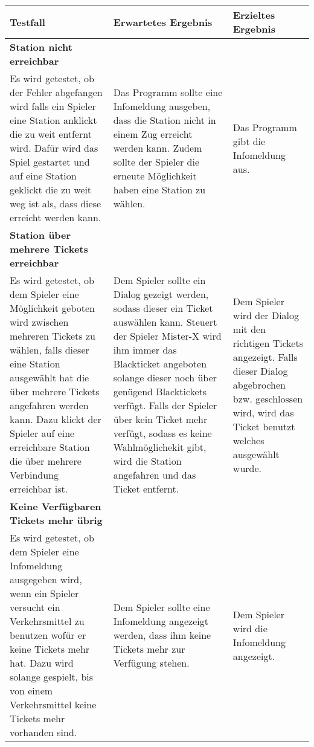     \begin{table}[H]
        \caption{Interaktions Tests}
        \begin{longtable}{p{6cm} p{4cm} p{2cm}} 
            \hline
            \textbf{Testfall} & \textbf{Erwartetes Ergebnis} & \textbf{Erzieltes Ergebnis}\\
            \hline
            \textbf{Station nicht erreichbar}\\
            Es wird getestet, ob der Fehler abgefangen wird falls ein Spieler eine Station anklickt die zu weit entfernt wird.
            Dafür wird das Spiel gestartet und auf eine Station geklickt die zu weit weg ist als, dass diese erreicht werden kann.
            &
            Das Programm sollte eine Infomeldung ausgeben, dass die Station nicht in einem Zug erreicht werden kann.
            Zudem sollte der Spieler die erneute Möglichkeit haben eine Station zu wählen.
            &
            Das Programm gibt die Infomeldung aus.
            \\
            \hline
            \textbf{Station über mehrere Tickets erreichbar}\\
            Es wird getestet, ob dem Spieler eine Möglichkeit geboten wird zwischen mehreren Tickets zu wählen, falls dieser eine Station ausgewählt hat
            die über mehrere Tickets angefahren werden kann.
            Dazu klickt der Spieler auf eine erreichbare Station die über mehrere Verbindung erreichbar ist.
            &
            Dem Spieler sollte ein Dialog gezeigt werden, sodass dieser ein Ticket auswählen kann. Steuert der Spieler Mister-X wird ihm immer das Blackticket angeboten solange
            dieser noch über genügend Blacktickets verfügt.
            Falls der Spieler über kein Ticket mehr verfügt, sodass es keine Wahlmöglichekit gibt, wird die Station angefahren und das Ticket entfernt.
            &
            Dem Spieler wird der Dialog mit den richtigen Tickets angezeigt. Falls dieser Dialog abgebrochen bzw. geschlossen wird, wird das Ticket benutzt welches ausgewählt wurde.
            \\
            \hline
            \textbf{Keine Verfügbaren Tickets mehr übrig}\\
            Es wird getestet, ob dem Spieler eine Infomeldung ausgegeben wird, wenn ein Spieler versucht ein Verkehrsmittel zu benutzen
            wofür er keine Tickets mehr hat.
            Dazu wird solange gespielt, bis von einem Verkehrsmittel keine Tickets mehr vorhanden sind.
            &
            Dem Spieler sollte eine Infomeldung angezeigt werden, dass ihm keine Tickets mehr zur Verfügung stehen.
            &
            Dem Spieler wird die Infomeldung angezeigt.
            \\
            \hline
        \end{longtable}
    \end{table}

